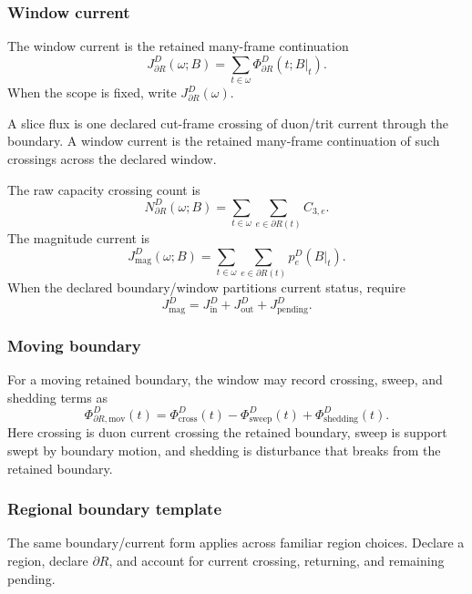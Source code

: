 \subsubsection{Window current}
\label{subsec:window-current}
\begin{definition}
The window current is the retained many-frame continuation
\begin{equation}
J^D_{\partial R}(\omega;B)
=
\sum_{t\in\omega}
\Phi^D_{\partial R}(t;B|_t).
\label{eq:window-current}
\end{equation}
When the scope is fixed, write \(J^D_{\partial R}(\omega)\).
\end{definition}
A slice flux is one declared cut-frame crossing of duon/trit current through the boundary. A window current is the retained many-frame continuation of such crossings across the declared window.

The raw capacity crossing count is
\begin{equation}
N^D_{\partial R}(\omega;B)
=
\sum_{t\in\omega}
\sum_{e\in\partial R(t)}
C_{3,e}.
\label{eq:raw-capacity-crossing-count}
\end{equation}
The magnitude current is
\begin{equation}
J^D_{\mathrm{mag}}(\omega;B)
=
\sum_{t\in\omega}
\sum_{e\in\partial R(t)}
p^D_e(B|_t).
\label{eq:magnitude-current}
\end{equation}
When the declared boundary/window partitions current status, require
\begin{equation}
J^D_{\mathrm{mag}}
=
J^D_{\mathrm{in}}+J^D_{\mathrm{out}}+J^D_{\mathrm{pending}}.
\label{eq:current-magnitude-split}
\end{equation}

\subsubsection{Moving boundary}
\label{subsec:moving-boundary}
For a moving retained boundary, the window may record crossing, sweep, and shedding terms as
\begin{equation}
\Phi^D_{\partial R,\mathrm{mov}}(t)
=
\Phi^D_{\mathrm{cross}}(t)
-
\Phi^D_{\mathrm{sweep}}(t)
+
\Phi^D_{\mathrm{shedding}}(t).
\label{eq:moving-boundary}
\end{equation}
Here crossing is duon current crossing the retained boundary, sweep is support swept by boundary motion, and shedding is disturbance that breaks from the retained boundary.

\subsubsection{Regional boundary template}
\label{subsec:regional-boundary-template}
The same boundary/current form applies across familiar region choices. Declare a region, declare \(\partial R\), and account for current crossing, returning, and remaining pending.

